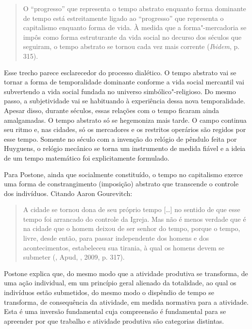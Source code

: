 \begin{quote}
O ``progresso'' que representa o tempo abstrato enquanto forma dominante
de tempo está estreitamente ligado ao ``progresso'' que representa o
capitalismo enquanto forma de vida. À medida que a forma"-mercadoria se
impôs como forma estruturante da vida social no decurso dos séculos que
seguiram, o tempo abstrato se tornou cada vez mais corrente
(\emph{Ibidem}, p. 315).
\end{quote}

Esse trecho parece esclarecedor do processo dialético. O tempo abstrato
vai se tornar a forma de temporalidade dominante conforme a vida social
mercantil vai subvertendo a vida social fundada no universo
simbólico"-religioso. Do mesmo passo, a subjetividade vai se habituando à
experiência dessa nova temporalidade. Apesar disso, durante séculos,
essas relações com o tempo ficaram ainda amalgamadas. O tempo abstrato
só se hegemoniza mais tarde. O campo continua seu ritmo e, nas cidades,
só os mercadores e os restritos operários são regidos por esse tempo.
Somente no século  com a invenção do relógio de pêndulo feita por
Huyguens, o relógio mecânico se torna um instrumento de medida fiável e
a ideia de um tempo matemático foi explicitamente formulado.

Para Postone, ainda que socialmente constituído, o tempo no capitalismo
exerce uma forma de constrangimento (imposição) abstrato que transcende
o controle dos indivíduos. Citando Aaron Gourevitch:

\begin{quote}
A cidade se tornou dona de seu próprio tempo [\ldots{}] no sentido de que
esse tempo foi arrancado do controle da Igreja. Mas não é menos verdade
que é na cidade que o homem deixou de ser senhor do tempo, porque o
tempo, livre, desde então, para passar independente dos homens e dos
acontecimentos, estabeleceu sua tirania, à qual os homens devem se
submeter (, Apud, , 2009, p. 317).
\end{quote}

Postone explica que, do mesmo modo que a atividade produtiva se
transforma, de uma ação individual, em um princípio geral alienado da
totalidade, ao qual os indivíduos estão submetidos, do mesmo modo o
dispêndio de tempo se transforma, de consequência da atividade, em
medida normativa para a atividade. Esta é uma inversão fundamental
cuja compreensão é fundamental para se apreender por que trabalho
e atividade produtiva são categorias distintas.

